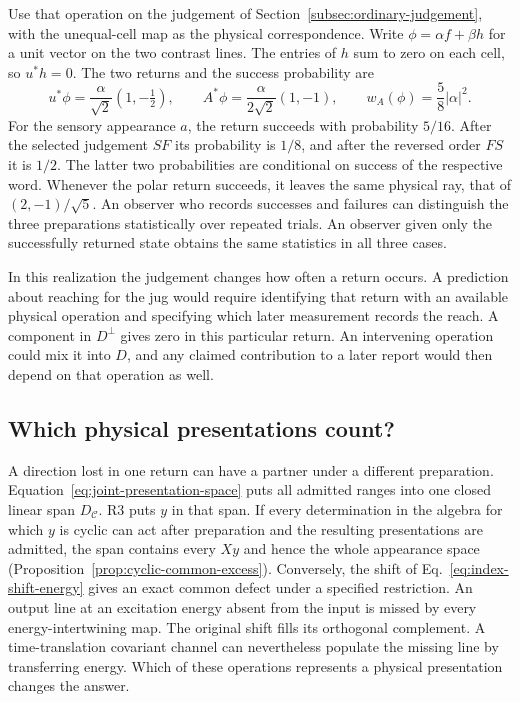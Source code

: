 \documentclass[11pt]{article}
\theoremstyle{definition}
\begin{document}
Use that operation on the judgement of Section~\ref{subsec:ordinary-judgement}, with the unequal-cell map as the physical correspondence. Write $\phi=\alpha f+\beta h$ for a unit vector on the two contrast lines. The entries of $h$ sum to zero on each cell, so $u^*h=0$. The two returns and the success probability are
\begin{equation}
 u^*\phi=\frac{\alpha}{\sqrt2}(1,-\tfrac12),\qquad
 A^*\phi=\frac{\alpha}{2\sqrt2}(1,-1),\qquad
 w_A(\phi)=\frac58|\alpha|^2 .
 \label{eq:jug-physical-return}
\end{equation}
For the sensory appearance $a$, the return succeeds with probability $5/16$. After the selected judgement $SF$ its probability is $1/8$, and after the reversed order $FS$ it is $1/2$. The latter two probabilities are conditional on success of the respective word. Whenever the polar return succeeds, it leaves the same physical ray, that of $(2,-1)/\sqrt5$. An observer who records successes and failures can distinguish the three preparations statistically over repeated trials. An observer given only the successfully returned state obtains the same statistics in all three cases.

In this realization the judgement changes how often a return occurs. A prediction about reaching for the jug would require identifying that return with an available physical operation and specifying which later measurement records the reach. A component in $D^\perp$ gives zero in this particular return. An intervening operation could mix it into $D$, and any claimed contribution to a later report would then depend on that operation as well.

\subsection{Which physical presentations count?}
\label{subsec:admissible-presentations}

A direction lost in one return can have a partner under a different preparation. Equation~\eqref{eq:joint-presentation-space} puts all admitted ranges into one closed linear span $D_{\mathcal C}$. R3 puts $y$ in that span. If every determination in the algebra for which $y$ is cyclic can act after preparation and the resulting presentations are admitted, the span contains every $Xy$ and hence the whole appearance space (Proposition~\ref{prop:cyclic-common-excess}). Conversely, the shift of Eq.~\eqref{eq:index-shift-energy} gives an exact common defect under a specified restriction. An output line at an excitation energy absent from the input is missed by every energy-intertwining map. The original shift fills its orthogonal complement. A time-translation covariant channel can nevertheless populate the missing line by transferring energy. Which of these operations represents a physical presentation changes the answer.
\end{document}
